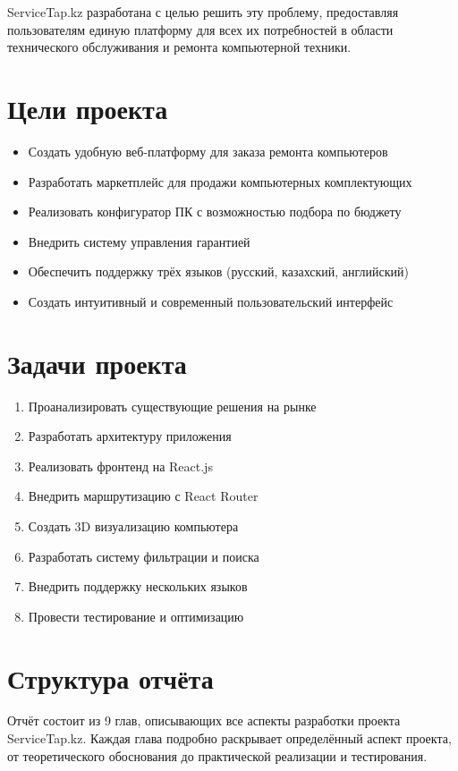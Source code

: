 \documentclass[12pt,a4paper]{report}
\begin{document}
ServiceTap.kz разработана с целью решить эту проблему, предоставляя пользователям единую платформу для всех их потребностей в области технического обслуживания и ремонта компьютерной техники.

\section{Цели проекта}
\begin{itemize}
    \item Создать удобную веб-платформу для заказа ремонта компьютеров
    \item Разработать маркетплейс для продажи компьютерных комплектующих
    \item Реализовать конфигуратор ПК с возможностью подбора по бюджету
    \item Внедрить систему управления гарантией
    \item Обеспечить поддержку трёх языков (русский, казахский, английский)
    \item Создать интуитивный и современный пользовательский интерфейс
\end{itemize}

\section{Задачи проекта}
\begin{enumerate}
    \item Проанализировать существующие решения на рынке
    \item Разработать архитектуру приложения
    \item Реализовать фронтенд на React.js
    \item Внедрить маршрутизацию с React Router
    \item Создать 3D визуализацию компьютера
    \item Разработать систему фильтрации и поиска
    \item Внедрить поддержку нескольких языков
    \item Провести тестирование и оптимизацию
\end{enumerate}

\section{Структура отчёта}
Отчёт состоит из 9 глав, описывающих все аспекты разработки проекта ServiceTap.kz. Каждая глава подробно раскрывает определённый аспект проекта, от теоретического обоснования до практической реализации и тестирования.
\end{document}
